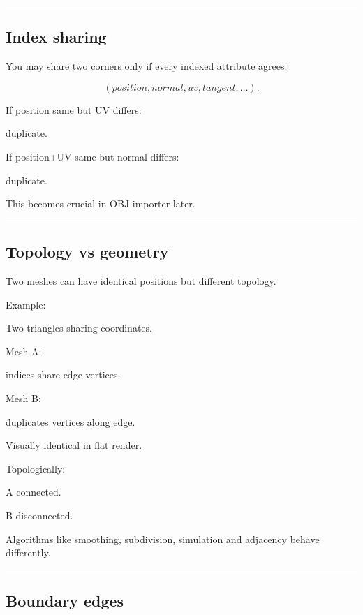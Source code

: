\begin{center}\rule{0.5\linewidth}{0.5pt}\end{center}

\subsection{Index sharing}\label{04-visual-computing-ii-ch041-index-sharing}

You may share two corners only if every indexed attribute agrees:

\[
(position,normal,uv,tangent,\ldots).
\]

If position same but UV differs:

duplicate.

If position+UV same but normal differs:

duplicate.

This becomes crucial in OBJ importer later.

\begin{center}\rule{0.5\linewidth}{0.5pt}\end{center}

\subsection{Topology vs geometry}\label{04-visual-computing-ii-ch041-topology-vs-geometry}

Two meshes can have identical positions but different topology.

Example:

Two triangles sharing coordinates.

Mesh A:

indices share edge vertices.

Mesh B:

duplicates vertices along edge.

Visually identical in flat render.

Topologically:

A connected.

B disconnected.

Algorithms like smoothing, subdivision, simulation and adjacency behave differently.

\begin{center}\rule{0.5\linewidth}{0.5pt}\end{center}

\subsection{Boundary edges}\label{04-visual-computing-ii-ch041-boundary-edges}

